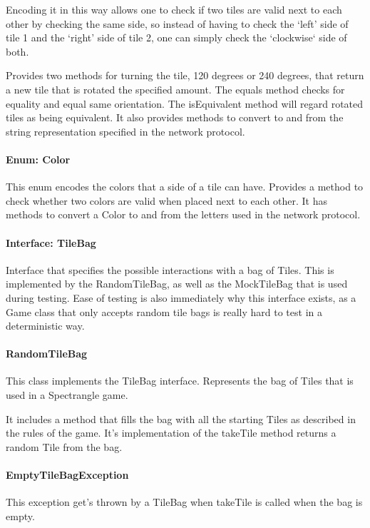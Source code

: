 \documentclass[12pt, letterpaper]{article}
\begin{document}
    Encoding it in this way allows one to check if two tiles are valid next to each other by checking the same side,
    so instead of having to check the `left' side of tile 1 and the `right' side of tile 2, one can simply check
    the `clockwise` side of both.

    Provides two methods for turning the tile, 120 degrees or 240 degrees, that return a new tile that is rotated
    the specified amount.
    The equals method checks for equality and equal same orientation.
    The isEquivalent method will regard rotated tiles as being equivalent.
    It also provides methods to convert to and from the string representation specified in the network protocol.

    \paragraph{Enum: Color}
    This enum encodes the colors that a side of a tile can have.
    Provides a method to check whether two colors are valid when placed next to each other.
    It has methods to convert a Color to and from the letters used in the network protocol.

    \paragraph{Interface: TileBag}
    Interface that specifies the possible interactions with a bag of Tiles.
    This is implemented by the RandomTileBag, as well as the MockTileBag that is used during testing.
    Ease of testing is also immediately why this interface exists, as a Game class that only accepts random
    tile bags is really hard to test in a deterministic way.

    \paragraph{RandomTileBag}
    This class implements the TileBag interface.
    Represents the bag of Tiles that is used in a Spectrangle game.

    It includes a method that fills the bag with all the starting Tiles as described in the rules of the game.
    It's implementation of the takeTile method returns a random Tile from the bag.

    \paragraph{EmptyTileBagException}
    This exception get's thrown by a TileBag when takeTile is called when the bag is empty.
\end{document}
